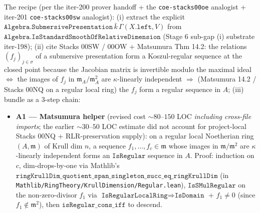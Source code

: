 The recipe (per the iter-200 prover handoff + the
\texttt{coe-stacks00oe} analogist + iter-201 \texttt{coe-stacks00sw}
analogist):
(i) extract the explicit
\(\texttt{Algebra.SubmersivePresentation}\,\bar k\,
 \Gamma(X.\texttt{left}, V)\) from
\(\texttt{Algebra.IsStandardSmoothOfRelativeDimension}\) (Stage 6 sub-gap
(i) substrate iter-198); (ii) cite Stacks 00SW / 00OW + Matsumura
Thm 14.2: the relations \((f_j)_{j \in \sigma}\) of a submersive
presentation form a Koszul-regular sequence at the closed point
because the Jacobian matrix is invertible modulo the maximal ideal
\(\Leftrightarrow\) the images of \(f_j\) in \(\mathfrak m_A /
\mathfrak m_A^2\) are \(\kappa\)-linearly independent
\(\Rightarrow\) (Matsumura 14.2 / Stacks 00NQ on a regular local
ring) the \(f_j\) form a regular sequence in \(A\); (iii) bundle
as a 3-step chain:
\begin{itemize}
  \item \textbf{A1 — Matsumura helper} (revised cost
    \(\sim 80\)--\(150\) LOC \emph{including cross-file imports}; the
    earlier \(\sim 30\)--\(50\) LOC estimate did not account for
    project-local Stacks 00NQ + RLR-preservation supply): on a regular
    local Noetherian ring \((A, \mathfrak m)\) of Krull dim \(n\), a
    sequence \(f_1, \dots, f_c \in \mathfrak m\) whose images in
    \(\mathfrak m / \mathfrak m^2\) are \(\kappa\)-linearly
    independent forms an \(\texttt{IsRegular}\) sequence in \(A\).
    Proof: induction on \(c\), dim-drops-by-one via Mathlib's
    \(\texttt{ringKrullDim\_quotient\_span\_singleton\_succ\_eq\_ringKrullDim}\)
    (in \texttt{Mathlib/RingTheory/KrullDimension/Regular.lean}),
    \(\texttt{IsSMulRegular}\) on the non-zero-divisor \(f_1\) via
    \(\texttt{IsRegularLocalRing} \Rightarrow \texttt{IsDomain}\) +
    \(f_1 \neq 0\) (since \(f_1 \notin \mathfrak m^2\)), then
    \(\texttt{isRegular\_cons\_iff}\) to descend.


\end{itemize}
